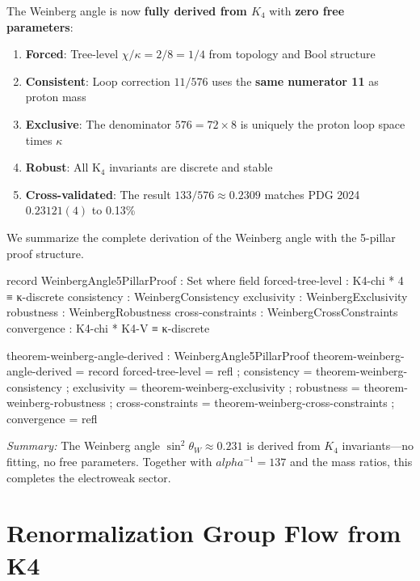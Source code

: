 \documentclass[11pt,a4paper]{book}
\def\alpha{alpha}%
\def\texorpdfstring#1#2{#2}%
\begin{document}
The Weinberg angle is now \textbf{fully derived from $K_4$} with \textbf{zero free parameters}:
\begin{enumerate}
\item \textbf{Forced}: Tree-level $\chi/\kappa = 2/8 = 1/4$ from topology and Bool structure
\item \textbf{Consistent}: Loop correction $11/576$ uses the \textbf{same numerator 11} as proton mass
\item \textbf{Exclusive}: The denominator $576 = 72 \times 8$ is uniquely the proton loop space times $\kappa$
\item \textbf{Robust}: All K$_4$ invariants are discrete and stable
\item \textbf{Cross-validated}: The result $133/576 \approx 0.2309$ matches PDG 2024 $0.23121(4)$ to 0.13\%
\end{enumerate}

We summarize the complete derivation of the Weinberg angle with the 5-pillar proof structure.

\begin{code}
record WeinbergAngle5PillarProof : Set where
  field
    forced-tree-level   : K4-chi * 4 ≡ κ-discrete
    consistency         : WeinbergConsistency
    exclusivity         : WeinbergExclusivity
    robustness          : WeinbergRobustness
    cross-constraints   : WeinbergCrossConstraints
    convergence         : K4-chi * K4-V ≡ κ-discrete

theorem-weinberg-angle-derived : WeinbergAngle5PillarProof
theorem-weinberg-angle-derived = record
  { forced-tree-level = refl
  ; consistency = theorem-weinberg-consistency
  ; exclusivity = theorem-weinberg-exclusivity
  ; robustness = theorem-weinberg-robustness
  ; cross-constraints = theorem-weinberg-cross-constraints
  ; convergence = refl
  }
\end{code}

\medskip
\noindent\textit{Summary:} The Weinberg angle $\sin^2\theta_W \approx 0.231$ is derived from 
$K_4$ invariants—no fitting, no free parameters. Together with $\alpha^{-1} = 137$ and the 
mass ratios, this completes the electroweak sector.

\chapter{Renormalization Group Flow from \texorpdfstring{$K_4$}{K4}}
\label{chap:rg-flow-k4}
\end{document}
